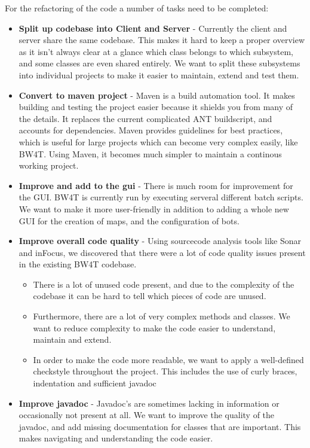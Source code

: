 For the refactoring of the code a number of tasks need to be completed:
\begin{itemize}
  \item
  \textbf{Split up codebase into Client and Server} - Currently the client and
  server share the same codebase. This makes it hard to keep a proper overview as
  it isn't always clear at a glance which class belongs to which subsystem, and
  some classes are even shared entirely. We want to split these subsystems into
  individual projects to make it easier to maintain, extend and test them. 
  \item
  \textbf{Convert to \Gls{maven} project} - Maven is a build automation tool. It makes building and testing the project easier because it shields you from many of the details. It replaces the current complicated ANT buildscript, and accounts for dependencies. Maven provides guidelines for best practices, which is useful for large projects which can become very complex easily, like BW4T. Using Maven, it becomes much simpler to maintain a continous working project.
  \item
  \textbf{Improve and add to the \gls{gui}} - There is much room for improvement for
  the GUI. BW4T is currently run by executing serveral different batch scripts. We want to make it more user-friendly in addition to adding a whole
  new GUI for the creation of maps, and the configuration of bots. 
  \item
  \textbf{Improve overall code quality} - Using sourcecode analysis tools like Sonar and inFocus, we discovered that there were a lot of code quality issues present in the existing BW4T codebase.
  \begin{itemize}
  \item 
  There is a lot of unused code present, and due to the
  complexity of the codebase it can be hard to tell which pieces of code are
  unused. 
  \item
  Furthermore, there are a lot of very complex methods and classes. We want to reduce complexity to make the code easier to understand, maintain and extend.
  \item
  In order to make the code more readable, we want to apply a well-defined checkstyle throughout the project. This includes the use of curly braces, indentation and sufficient javadoc   
  \end{itemize}
  \item
  \textbf{Improve \gls{javadoc}} - Javadoc's are sometimes lacking in information or
  occasionally not present at all. We want to improve the quality of the javadoc, and add missing documentation for classes that are important. This makes navigating and understanding the code easier. 

\end{itemize}
